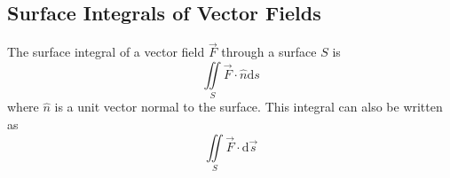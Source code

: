 \subsection{Surface Integrals of Vector Fields}
\begin{definition}
	The surface integral of a vector field $\vec{F}$ through a surface $S$ is 
	\begin{equation*}
		\iint\limits_{S}{\vec{F} \cdot \hat{n}\mathrm{d}s}	
	\end{equation*}
	where $\hat{n}$ is a unit vector normal to the surface.
	This integral can also be written as 
	\begin{equation*}
		\iint\limits_{S}{\vec{F} \cdot \mathrm{d}\vec{s}}
	\end{equation*}
\end{definition}


